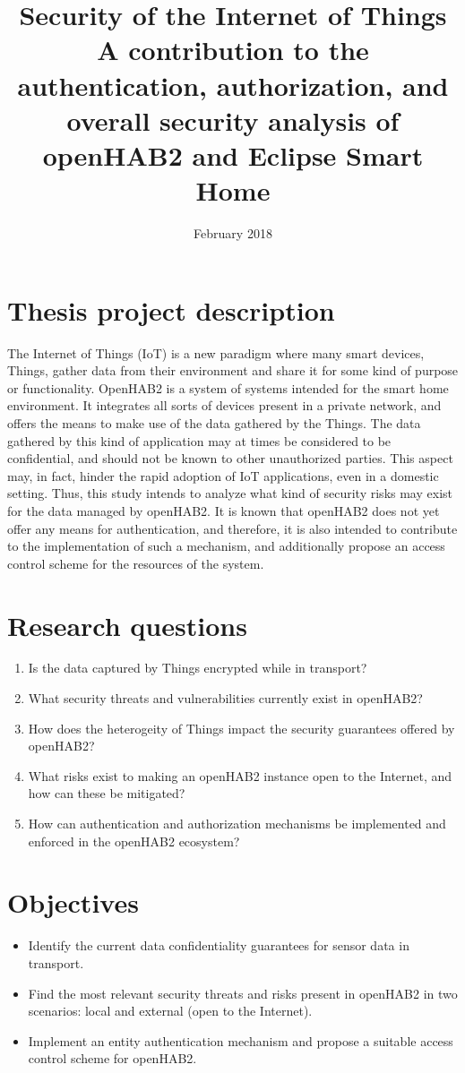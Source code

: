 \documentclass[12pt, A4]{article}
\title{Security of the Internet of Things \\
  \large A contribution to the authentication, authorization, and overall security analysis of openHAB2 and Eclipse Smart Home}
\date{February 2018}
\begin{document}
\maketitle

\section{Thesis project description}
The Internet of Things (IoT) is a new paradigm where many smart devices, Things, gather data from their environment and share it for some kind of purpose or functionality. OpenHAB2 is a system of systems intended for the smart home environment. It integrates all sorts of devices present in a private network, and offers the means to make use of the data gathered by the Things. The data gathered by this kind of application may at times be considered to be confidential, and should not be known to other unauthorized parties. This aspect may, in fact, hinder the rapid adoption of IoT applications, even in a domestic setting. Thus, this study intends to analyze what kind of security risks may exist for the data managed by openHAB2. It is known that openHAB2 does not yet offer any means for authentication, and therefore, it is also intended to contribute to the implementation of such a mechanism, and additionally propose an access control scheme for the resources of the system.

\section{Research questions}
\begin{enumerate}
\item Is the data captured by Things encrypted while in transport?
\item What security threats and vulnerabilities currently exist in openHAB2?
\item How does the heterogeity of Things impact the security guarantees offered by openHAB2?
\item What risks exist to making an openHAB2 instance open to the Internet, and how can these be mitigated?
\item How can authentication and authorization mechanisms be implemented and enforced in the openHAB2 ecosystem?  
\end{enumerate}

\section{Objectives}
\begin{itemize}
\item Identify the current data confidentiality guarantees for sensor data in transport.
\item Find the most relevant security threats and risks present in openHAB2 in two scenarios: local and external (open to the Internet).
\item Implement an entity authentication mechanism and propose a suitable access control scheme for openHAB2.
\end{itemize}
\end{document}

